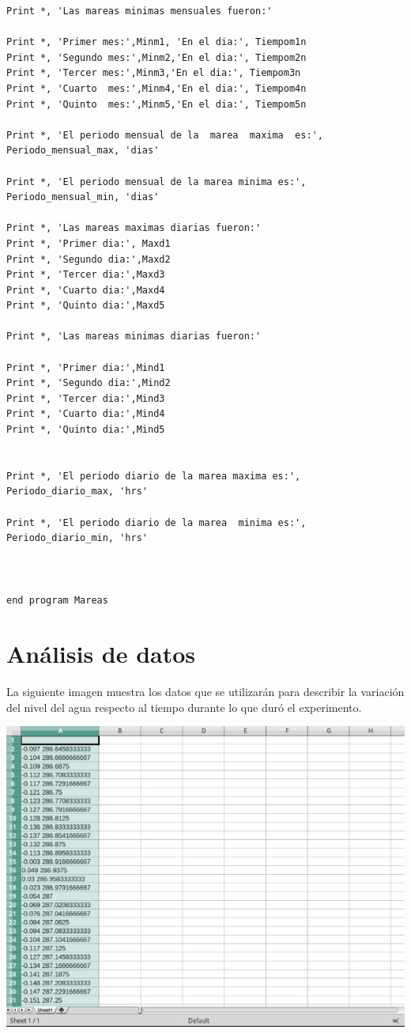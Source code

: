 \documentclass[]{article}
\begin{document}
\begin{verbatim}
Print *, 'Las mareas minimas mensuales fueron:'
       
Print *, 'Primer mes:',Minm1, 'En el dia:', Tiempom1n
Print *, 'Segundo mes:',Minm2,'En el dia:', Tiempom2n           
Print *, 'Tercer mes:',Minm3,'En el dia:', Tiempom3n
Print *, 'Cuarto  mes:',Minm4,'En el dia:', Tiempom4n              
Print *, 'Quinto  mes:',Minm5,'En el dia:', Tiempom5n

Print *, 'El periodo mensual de la  marea  maxima  es:', Periodo_mensual_max, 'dias'

Print *, 'El periodo mensual de la marea minima es:', Periodo_mensual_min, 'dias'

Print *, 'Las mareas maximas diarias fueron:'       
Print *, 'Primer dia:', Maxd1
Print *, 'Segundo dia:',Maxd2           
Print *, 'Tercer dia:',Maxd3
Print *, 'Cuarto dia:',Maxd4           
Print *, 'Quinto dia:',Maxd5

Print *, 'Las mareas minimas diarias fueron:'     

Print *, 'Primer dia:',Mind1
Print *, 'Segundo dia:',Mind2             
Print *, 'Tercer dia:',Mind3
Print *, 'Cuarto dia:',Mind4              
Print *, 'Quinto dia:',Mind5


Print *, 'El periodo diario de la marea maxima es:', Periodo_diario_max, 'hrs'

Print *, 'El periodo diario de la marea  minima es:', Periodo_diario_min, 'hrs' 



end program Mareas

\end{verbatim}

\section*{An\'alisis de datos}
La siguiente imagen muestra los datos que se utilizar\'an para describir la variaci\'on del nivel del agua respecto al tiempo durante lo que dur\'o el experimento.

\includegraphics[scale=0.5]{Datos}\\
\end{document}
